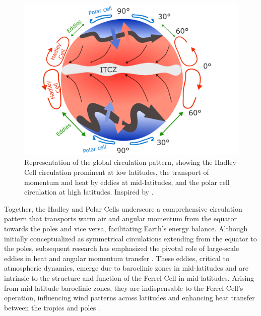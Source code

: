 \begin{figure}[h!]
\begin{center}
\setcaptionmargin{1cm}
\includegraphics[width=0.9\columnwidth,angle=0]{fig/global_circulation.pdf}
\caption[Global Circulation]{Representation of the global circulation pattern, showing the Hadley Cell circulation prominent at low latitudes, the transport of momentum and heat by eddies at mid-latitudes, and the polar cell circulation at high latitudes. Inspired by \citet{stull2015practical}.}
\label{global_circulation}
\end{center}
\end{figure}


Together, the Hadley and Polar Cells underscore a comprehensive circulation pattern that transports warm air and angular momentum from the equator towards the poles and vice versa, facilitating Earth's energy balance. Although initially conceptualized as symmetrical circulations extending from the equator to the poles, subsequent research has emphasized the pivotal role of large-scale eddies in heat and angular momentum transfer \citep{schneider2006general}. These eddies, critical to atmospheric dynamics, emerge due to baroclinic zones in mid-latitudes and are intrinsic to the structure and function of the Ferrel Cell in mid-latitudes\citep{held1999macroturbulence,schneider2006general}. Arising from mid-latitude baroclinic zones, they are indispensable to the Ferrel Cell's operation, influencing wind patterns across latitudes and enhancing heat transfer between the tropics and poles \citep{stull2015practical, held1999macroturbulence}.

